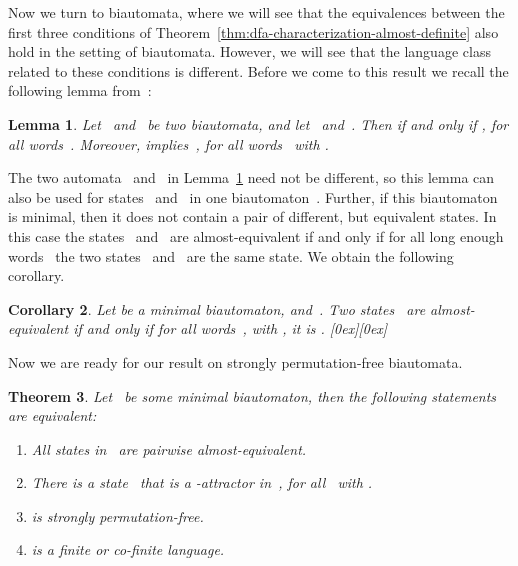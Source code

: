 \documentclass[submission]{eptcs}
\newcommand*{\qed}{\raisebox{0.5ex}[0ex][0ex]{\framebox[1ex][l]{}}}
\newtheorem{theorem}{Theorem}
\newtheorem{lemma}[theorem]{Lemma}
\newtheorem{corollary}[theorem]{Corollary}
\begin{document}
Now we turn to biautomata, where we will see that the equivalences
between the first three conditions of
Theorem~\ref{thm:dfa-characterization-almost-definite} also hold in
the setting of biautomata.  However, we will see that the language
class related to these conditions is different.
Before we come to this result we recall the following lemma
from~\cite{HoJa14}:

\begin{lemma}\label{lem:dbia-almost-equiv-right-invariant}
  Let~
  and~ be two biautomata, and
  let~ and~.  Then  if and only if , for all words~.
  Moreover,  implies~, for all words~ with .
\end{lemma}

The two automata~ and~ in
Lemma~\ref{lem:dbia-almost-equiv-right-invariant} need not be
different, so this lemma can also be used for states~ and~ in
one biautomaton~.  Further, if this biautomaton~ is minimal,
then it does not contain a pair of different, but equivalent states.
In this case the states~ and~ are almost-equivalent if and only
if for all long enough words~ the two states~ and~ are the same state.  We obtain the
following corollary.

\begin{corollary}\label{cor:p-q-almost-iff-equal-for-long-words}
  Let  be a \emph{minimal} biautomaton,
  and~.  Two states~ are
  almost-equivalent if and only if for all words~,
  with , it is . \hfill \qed
\end{corollary}

Now we are ready for our result on strongly permutation-free
biautomata.

\begin{theorem}\label{thm:dbia-characterization-almost-co-finite}
  Let~ be some \emph{minimal} biautomaton,
  then the following statements are equivalent:
  \begin{enumerate}
  \item All states in~ are pairwise
    almost-equivalent.  \label{item:dbia-charact-almost}
  \item There is a state~ that is a -attractor in~,
    for all~ with . \label{item:dbia-charact-attractor}
  \item  is strongly
    permutation-free.  \label{item:dbia-charact-permutation}
  \item  is a finite or co-finite
    language.\label{item:dbia-charact-definite}
  \end{enumerate}  
\end{theorem}
\end{document}
